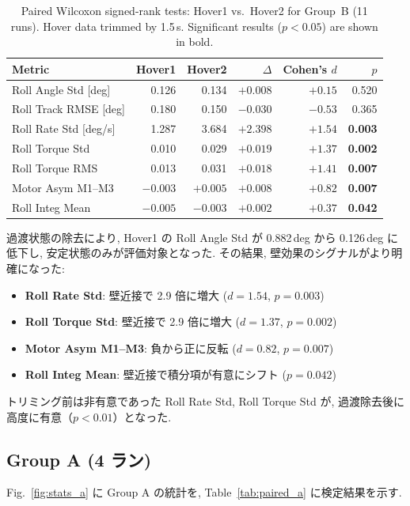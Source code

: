 \documentclass[11pt,a4paper]{ltjsarticle}
\begin{document}
\begin{table}[H]
\centering
\caption{Paired Wilcoxon signed-rank tests: Hover1 vs.\ Hover2 for Group~B (11 runs). Hover data trimmed by 1.5\,s. Significant results ($p < 0.05$) are shown in bold.}
\label{tab:paired_b}
\begin{tabular}{lrrrrr}
\toprule
Metric & Hover1 & Hover2 & $\Delta$ & Cohen's $d$ & $p$ \\
\midrule
Roll Angle Std [deg]     & 0.126 & 0.134 & $+0.008$ & $+0.15$ & 0.520 \\
Roll Track RMSE [deg]    & 0.180 & 0.150 & $-0.030$ & $-0.53$ & 0.365 \\
Roll Rate Std [deg/s]    & 1.287 & 3.684 & $+2.398$ & $+1.54$ & \textbf{0.003} \\
Roll Torque Std          & 0.010 & 0.029 & $+0.019$ & $+1.37$ & \textbf{0.002} \\
Roll Torque RMS          & 0.013 & 0.031 & $+0.018$ & $+1.41$ & \textbf{0.007} \\
Motor Asym M1--M3        & $-0.003$ & $+0.005$ & $+0.008$ & $+0.82$ & \textbf{0.007} \\
Roll Integ Mean          & $-0.005$ & $-0.003$ & $+0.002$ & $+0.37$ & \textbf{0.042} \\
\bottomrule
\end{tabular}
\end{table}

過渡状態の除去により, Hover1 の Roll Angle Std が 0.882\,deg から 0.126\,deg に低下し, 安定状態のみが評価対象となった. その結果, 壁効果のシグナルがより明確になった:
\begin{itemize}
    \item \textbf{Roll Rate Std}: 壁近接で 2.9 倍に増大 ($d = 1.54$, $p = 0.003$)
    \item \textbf{Roll Torque Std}: 壁近接で 2.9 倍に増大 ($d = 1.37$, $p = 0.002$)
    \item \textbf{Motor Asym M1--M3}: 負から正に反転 ($d = 0.82$, $p = 0.007$)
    \item \textbf{Roll Integ Mean}: 壁近接で積分項が有意にシフト ($p = 0.042$)
\end{itemize}
トリミング前は非有意であった Roll Rate Std, Roll Torque Std が, 過渡除去後に高度に有意（$p < 0.01$）となった.

\subsection{Group A (4 ラン)}

Fig.~\ref{fig:stats_a} に Group A の統計を, Table~\ref{tab:paired_a} に検定結果を示す.
\end{document}

